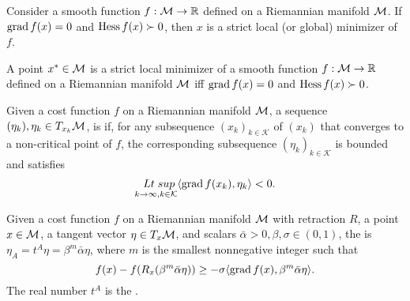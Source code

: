 \documentclass[11pt,a4paper]{article}
\begin{document}
\begin{proposition}
Consider a smooth function $f:\mathcal{M}\rightarrow \mathbb{R}$ defined on a Riemannian manifold $\mathcal{M}$. If $\text{grad}\, f(x) = 0$ and $\text{Hess}\, f(x) \succ 0$, then $x$ is a strict local (or global) minimizer of $f$.
\end{proposition}

\begin{remark}\label{remark:second_order_optimality_conditions}
A point $x^*\in \mathcal{M}$ is a strict local minimizer of a smooth function $f:\mathcal{M}\rightarrow \mathbb{R}$ defined on a Riemannian manifold $\mathcal{M}$ iff $\text{grad}\, f(x) = 0$ and $\text{Hess}\, f(x) \succ 0$.
\end{remark}

\begin{definition}
Given a cost function $f$ on a Riemannian manifold $\mathcal{M}$, a sequence $(\eta_k), \eta_k\in T_{x_k}\mathcal{M}$, is  if, for any subsequence $(x_k)_{k\in\mathcal{K}}$ of $(x_k)$ that converges to a non-critical point of $f$, the corresponding subsequence $(\eta_k)_{k\in\mathcal{K}}$ is bounded and satisfies
\begin{equation*}
\underset{k\rightarrow \infty,k\in\mathcal{K}}{\;\;Lt\;sup} \langle \text{grad}\, f(x_k), \eta_k \rangle < 0.
\end{equation*}
\end{definition}

\begin{definition}
Given a cost function $f$ on a Riemannian manifold $\mathcal{M}$ with retraction $R$, a point $x\in \mathcal{M}$, a tangent vector $\eta\in T_x\mathcal{M}$, and scalars $\bar{\alpha}>0,\beta,\sigma\in (0,1)$, the  is $\eta_A = t^A\eta = \beta^m\bar{\alpha}\eta$, where $m$ is the smallest nonnegative integer such that 
\begin{equation*}
f(x) - f(R_x(\beta^m\bar{\alpha}\eta)) \ge -\sigma\langle \text{grad}\, f(x), \beta^m\bar{\alpha}\eta \rangle.
\end{equation*}
The real number $t^A$ is the .
\end{definition}
\end{document}
